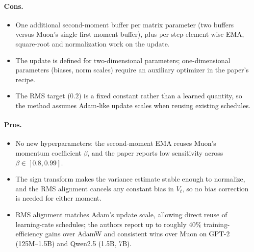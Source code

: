 \paragraph{Cons.}
\begin{itemize}[leftmargin=*]
\item One additional second-moment buffer per matrix parameter (two buffers versus Muon's single first-moment buffer), plus per-step element-wise EMA, square-root and normalization work on the update.
\item The update is defined for two-dimensional parameters; one-dimensional parameters (biases, norm scales) require an auxiliary optimizer in the paper's recipe.
\item The RMS target ($0.2$) is a fixed constant rather than a learned quantity, so the method assumes Adam-like update scales when reusing existing schedules.
\end{itemize}

\paragraph{Pros.}
\begin{itemize}[leftmargin=*]
\item No new hyperparameters: the second-moment EMA reuses Muon's momentum coefficient $\beta$, and the paper reports low sensitivity across $\beta \in [0.8, 0.99]$.
\item The sign transform makes the variance estimate stable enough to normalize, and the RMS alignment cancels any constant bias in $V_t$, so no bias correction is needed for either moment.
\item RMS alignment matches Adam's update scale, allowing direct reuse of learning-rate schedules; the authors report up to roughly 40\% training-efficiency gains over AdamW and consistent wins over Muon on GPT-2 (125M--1.5B) and Qwen2.5 (1.5B, 7B).
\end{itemize}

